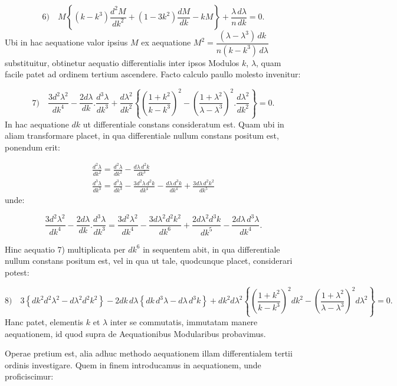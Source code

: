 \documentclass{article}
\begin{document}
\[
\text{6)}\quad M\left\{(k-k^{3})\frac{d^{2}M}{dk^{2}}+(1-3k^{2})\frac{dM}{dk}-kM\right\}+\frac{\lambda\,d\lambda}{n\,dk}=0.
\]
Ubi in hac aequatione valor ipsius $M$ ex aequatione $M^{2}=\dfrac{(\lambda-\lambda^{3})\,dk}{n(k-k^{3})\,d\lambda}$ substituitur, obtinetur aequatio differentialis inter ipsos Modulos $k$, $\lambda$, quam facile patet ad ordinem tertium ascendere. Facto calculo paullo molesto invenitur:

\[
\text{7)}\quad\frac{3d^{2}\lambda^{2}}{dk^{4}}-\frac{2d\lambda}{dk}.\frac{d^{3}\lambda}{dk^{3}}+\frac{d\lambda^{2}}{dk^{2}}\left\{\left(\frac{1+k^{2}}{k-k^{3}}\right)^{2}-\left(\frac{1+\lambda^{2}}{\lambda-\lambda^{3}}\right)^{2}.\frac{d\lambda^{2}}{dk^{2}}\right\}=0.
\]
In hac aequatione $dk$ ut differentiale constans consideratum est. Quam ubi in aliam transformare placet, in qua differentiale nullum constans positum est, ponendum erit:

\[
\begin{gathered}
\frac{d^{2}\lambda}{dk^{2}}=\frac{d^{2}\lambda}{dk^{2}}-\frac{d\lambda\,d^{2}k}{dk^{3}}\\[1.5ex]
\frac{d^{3}\lambda}{dk^{3}}=\frac{d^{3}\lambda}{dk^{3}}-\frac{3d^{2}\lambda\,d^{2}k}{dk^{4}}-\frac{d\lambda\,d^{3}k}{dk^{4}}+\frac{3d\lambda\,d^{2}k^{2}}{dk^{5}}
\end{gathered}
\]
unde:

\[
\frac{3d^{2}\lambda^{2}}{dk^{4}}-\frac{2d\lambda}{dk}.\frac{d^{3}\lambda}{dk^{3}}=\frac{3d^{2}\lambda^{2}}{dk^{4}}-\frac{3d\lambda^{2}d^{2}k^{2}}{dk^{6}}+\frac{2d\lambda^{2}d^{3}k}{dk^{5}}-\frac{2d\lambda\,d^{3}\lambda}{dk^{4}}.
\]

Hinc aequatio 7) multiplicata per $dk^{6}$ in sequentem abit, in qua differentiale nullum constans positum est, vel in qua ut tale, quodcunque placet, considerari potest:

\[
\text{8)}\quad3\left\{dk^{2}d^{2}\lambda^{2}-d\lambda^{2}d^{2}k^{2}\right\}-2dk\,d\lambda\left\{dk\,d^{3}\lambda-d\lambda\,d^{3}k\right\}+dk^{2}d\lambda^{2}\left\{\left(\frac{1+k^{2}}{k-k^{3}}\right)^{2}dk^{2}-\left(\frac{1+\lambda^{2}}{\lambda-\lambda^{3}}\right)^{2}d\lambda^{2}\right\}=0.
\]
Hanc patet, elementis $k$ et $\lambda$ inter se commutatis, immutatam manere aequationem, id quod supra de Aequationibus Modularibus probavimus.

Operae pretium est, alia adhuc methodo aequationem illam differentialem tertii ordinis investigare. Quem in finem introducamus in aequationem, unde proficiscimur:
\end{document}
